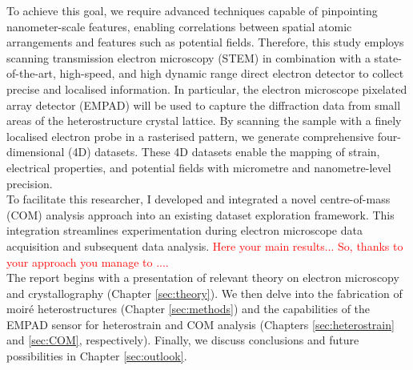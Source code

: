 To achieve this goal, we require advanced techniques capable of pinpointing nanometer-scale features, enabling correlations between spatial atomic arrangements and features such as potential fields. Therefore, this study employs scanning transmission electron microscopy (STEM) in combination with a state-of-the-art, high-speed, and high dynamic range direct electron detector to collect precise and localised information. In particular, the electron microscope pixelated array detector (EMPAD) will be used to capture the diffraction data from small areas of the heterostructure crystal lattice. By scanning the sample with a finely localised electron probe in a rasterised pattern, we generate comprehensive four-dimensional (4D) datasets. These 4D datasets enable the mapping of strain, electrical properties, and potential fields with micrometre and nanometre-level precision.\\

To facilitate this researcher, I developed and integrated a novel centre-of-mass (COM) analysis approach into an existing dataset exploration framework. This integration streamlines experimentation during electron microscope data acquisition and subsequent data analysis. \textcolor{red}{Here your main results... So, thanks to your approach you manage to ....}\\

The report begins with a presentation of relevant theory on electron microscopy and crystallography (Chapter \ref{sec:theory}). We then delve into the fabrication of moir\'e heterostructures (Chapter \ref{sec:methods}) and the capabilities of the EMPAD sensor for heterostrain and COM analysis (Chapters \ref{sec:heterostrain} and \ref{sec:COM}, respectively). Finally, we discuss conclusions and future possibilities in Chapter \ref{sec:outlook}.

